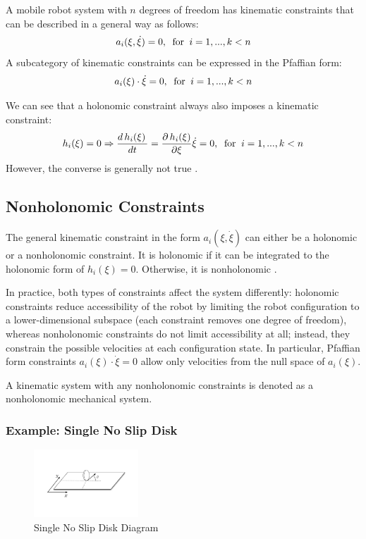 \documentclass[twoside]{article}
\begin{document}
\newpage

\begin{frm-def}
A mobile robot system with $n$ degrees of freedom has kinematic constraints that can be described in a general way as follows:
$$
a_i (\xi, \dot{\xi})=0,\;\;\textup{for}\;\;i = 1,...,k < n
$$
A subcategory of kinematic constraints can be expressed in the Pfaffian form:
$$
a_i(\xi) \cdot \dot{\xi} = 0,\;\;\textup{for}\;\;i = 1,...,k < n
$$
\end{frm-def}

We can see that a holonomic constraint always also imposes a kinematic constraint:
$$
h_i(\xi) = 0 \Rightarrow \frac{d\,h_i(\xi)\, }{dt} = \frac{\partial\,h_i(\xi)}{\partial \xi} \dot{\xi} = 0,\;\;\textup{for}\;\;i = 1,...,k < n
$$
However, the converse is generally not true \cite{ssvo}.

\subsection*{Nonholonomic Constraints}

The general kinematic constraint in the form $ a_i (\xi, \dot{\xi}) $ can either be a holonomic or a nonholonomic constraint. It is holonomic if it can be integrated to the holonomic form of $ h_i(\xi) = 0 $. Otherwise, it is nonholonomic \cite{ssvo}.

In practice, both types of constraints affect the system differently: holonomic constraints reduce accessibility of the robot by limiting the robot configuration to a lower-dimensional subspace (each constraint removes one degree of freedom), whereas nonholonomic constraints do not limit accessibility at all; instead, they constrain the possible velocities at each configuration state. In particular, Pfaffian form constraints $ a_i(\xi) \cdot \dot{\xi} = 0 $ allow only velocities from the null space of $ a_i (\xi) $.

A kinematic system with any nonholonomic constraints is denoted as a nonholonomic mechanical system.

\subsubsection*{Example: Single No Slip Disk \cite{ssvo}}

\begin{figure}[H]
\centering
\includegraphics[width=0.35\textwidth]{Slip_Disk_Example}
\caption{Single No Slip Disk Diagram}
\end{figure}
\end{document}
